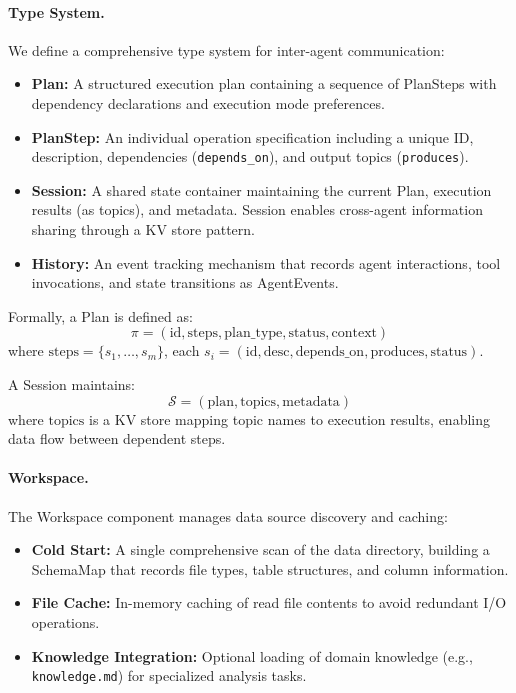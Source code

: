 \documentclass{article}
\theoremstyle{definition}
\begin{document}
\paragraph{Type System.}
We define a comprehensive type system for inter-agent communication:
\begin{itemize}[leftmargin=1.5em]
    \item \textbf{Plan:} A structured execution plan containing a sequence of PlanSteps with dependency declarations and execution mode preferences.
    \item \textbf{PlanStep:} An individual operation specification including a unique ID, description, dependencies (\texttt{depends\_on}), and output topics (\texttt{produces}).
    \item \textbf{Session:} A shared state container maintaining the current Plan, execution results (as topics), and metadata. Session enables cross-agent information sharing through a KV store pattern.
    \item \textbf{History:} An event tracking mechanism that records agent interactions, tool invocations, and state transitions as AgentEvents.
\end{itemize}

Formally, a Plan is defined as:
\[
\pi = (\text{id}, \text{steps}, \text{plan\_type}, \text{status}, \text{context})
\]
where $\text{steps} = \{s_1, \dots, s_m\}$, each $s_i = (\text{id}, \text{desc}, \text{depends\_on}, \text{produces}, \text{status})$.

A Session maintains:
\[
\mathcal{S} = (\text{plan}, \text{topics}, \text{metadata})
\]
where $\text{topics}$ is a KV store mapping topic names to execution results, enabling data flow between dependent steps.

\paragraph{Workspace.}
The Workspace component manages data source discovery and caching:
\begin{itemize}[leftmargin=1.5em]
    \item \textbf{Cold Start:} A single comprehensive scan of the data directory, building a SchemaMap that records file types, table structures, and column information.
    \item \textbf{File Cache:} In-memory caching of read file contents to avoid redundant I/O operations.
    \item \textbf{Knowledge Integration:} Optional loading of domain knowledge (e.g., \texttt{knowledge.md}) for specialized analysis tasks.
\end{itemize}
\end{document}
